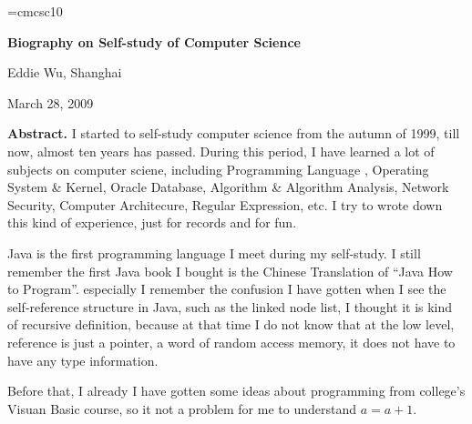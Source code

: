 

\magnification\magstephalf
\parskip3pt
\baselineskip14pt
\def\AW{Addison\kern.1em--Wesley}
\font\sc=cmcsc10 %


\centerline{\bf Biography on Self-study of Computer Science}
\bigskip
\centerline{Eddie Wu, Shanghai}
\bigskip
\centerline{March 28, 2009}
\bigskip
{
\baselineskip12pt

{\narrower\smallskip\noindent
{\bf Abstract.} I started to self-study computer science from the autumn of 
1999, till now, almost ten years has passed. During this period, I have
learned a lot of subjects on computer sciene, including 
Programming Language%
, Operating System \& Kernel, Oracle Database, Algorithm \& Algorithm Analysis,
 Network Security, Computer Architecure, Regular Expression, etc. I try to wrote 
 down this kind of experience, just for records and for fun.
\smallskip}

}


{}\par
{}\par
Java is the first programming language I meet during my self-study. I still 
remember the first Java book I bought is the Chinese Translation of ``Java How 
to Program''. especially I remember the confusion I have gotten when I see the 
self-reference structure in Java, such as the linked node list, I thought it is
 kind of recursive definition, because at that time I do not know that at 
the low level, reference is just a pointer, a word of random access memory, 
it does not have to have any type information. 

Before that, I already I have gotten some ideas about programming from college's 
Visuan Basic course, so it not a problem for me to understand $a=a+1$.

